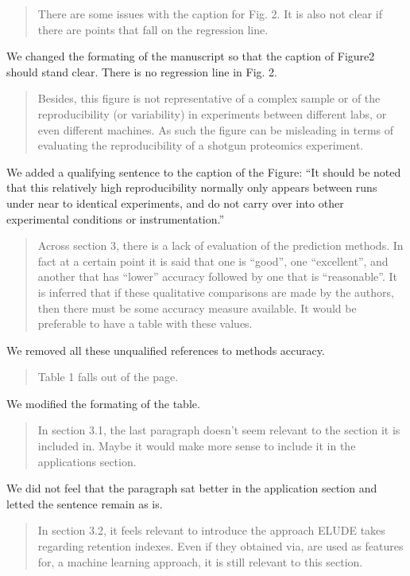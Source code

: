 \documentclass[letterpaper]{article}
\newcommand{\breview}{\begin{quotation}\begin{bf}\noindent}
\newcommand{\ereview}{\end{bf}\end{quotation}}
\begin{document}
\breview

There are some issues with the caption for Fig. 2. It is also not
clear if there are points that fall on the regression line. 

\ereview

We changed the formating of the manuscript so that the caption of
Figure2 should stand clear. There is no regression line in Fig. 2.

\breview

Besides, this figure is not representative of a complex sample or of
the reproducibility (or variability) in experiments between different
labs, or even different machines. As such the figure can be misleading
in terms of evaluating the reproducibility of a shotgun proteomics
experiment.

\ereview

We added a qualifying sentence to the caption of the Figure: ``It
should be noted that this relatively high reproducibility normally
only appears between runs under near to identical experiments, and do
not carry over into other experimental conditions or instrumentation.''

\breview

Across section 3, there is a lack of evaluation of the prediction
methods. In fact at a certain point it is said that one is ``good'',
one ``excellent'', and another that has ``lower'' accuracy followed by
one that is ``reasonable''. It is inferred that if these qualitative
comparisons are made by the authors, then there must be some accuracy
measure available. It would be preferable to have a table with these
values. 

\ereview

We removed all these unqualified references to methods accuracy.  

\breview

Table 1 falls out of the page.
\ereview
We modified the formating of the table.
\breview

In section 3.1, the last paragraph doesn’t seem relevant to the section it is included in. Maybe it would make more sense to include it in the applications section.
\ereview

We did not feel that the paragraph sat better in the application section and letted the sentence remain as is.

\breview

In section 3.2, it feels relevant to introduce the approach ELUDE takes regarding retention indexes. Even if they obtained via, are used as features for, a machine learning approach, it is still relevant to this section.
\ereview
\end{document}
